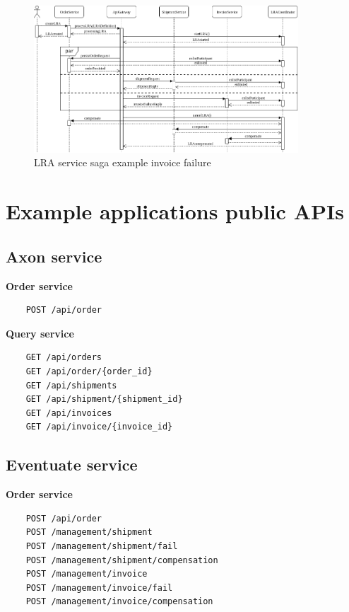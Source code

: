 \documentclass[oneside,
  digital, %
  table,   %
  lof,     %
  lot,     %
]{fithesis3}
\begin{document}
\hfill \break

\begin{figure}[h]
    \begin{center}
        \includegraphics[height=55mm]{images/sequence/invoiceFailSagaLRA.png}
    \end{center}
    \caption{LRA service saga example invoice failure}
\end{figure}


\clearpage
\chapter{Example applications public APIs}
\label{sec:appendixAPI}

\section{Axon service}

\textbf{Order service}

\begin{verbatim}
    POST /api/order
\end{verbatim}

\noindent
\textbf{Query service}

\begin{verbatim}
    GET /api/orders
    GET /api/order/{order_id}
    GET /api/shipments
    GET /api/shipment/{shipment_id}
    GET /api/invoices
    GET /api/invoice/{invoice_id}
\end{verbatim}

\section{Eventuate service}

\textbf{Order service}

\begin{verbatim}
    POST /api/order
    POST /management/shipment
    POST /management/shipment/fail
    POST /management/shipment/compensation
    POST /management/invoice
    POST /management/invoice/fail
    POST /management/invoice/compensation
\end{verbatim}
\end{document}
